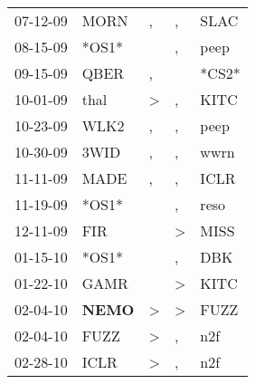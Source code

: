 \begin{supertabular}{p{0.07\textwidth}p{0.06\textwidth}p{0.02\textwidth}p{0.02\textwidth}p{0.06\textwidth}}
          07-12-09\textsuperscript{} &           MORN\textsuperscript{} &                , &                , &           SLAC\textsuperscript{} \\
          08-15-09\textsuperscript{} &                            *OS1* &                  &                , &           peep\textsuperscript{} \\
          09-15-09\textsuperscript{} &           QBER\textsuperscript{} &                , &                  &                            *CS2* \\
          10-01-09\textsuperscript{} &           thal\textsuperscript{} &     \textgreater &                , &           KITC\textsuperscript{} \\
          10-23-09\textsuperscript{} &           WLK2\textsuperscript{} &                , &                , &           peep\textsuperscript{} \\
          10-30-09\textsuperscript{} &           3WID\textsuperscript{} &                , &                , &           wwrn\textsuperscript{} \\
          11-11-09\textsuperscript{} &           MADE\textsuperscript{} &                , &                , &           ICLR\textsuperscript{} \\
          11-19-09\textsuperscript{} &                            *OS1* &                  &                , &           reso\textsuperscript{} \\
          12-11-09\textsuperscript{} &            FIR\textsuperscript{} &                  &     \textgreater &           MISS\textsuperscript{} \\
          01-15-10\textsuperscript{} &                            *OS1* &                  &                , &            DBK\textsuperscript{} \\
          01-22-10\textsuperscript{} &           GAMR\textsuperscript{} &                  &     \textgreater &           KITC\textsuperscript{} \\
          02-04-10\textsuperscript{} &  \textbf{NEMO\textsuperscript{}} &     \textgreater &     \textgreater &           FUZZ\textsuperscript{} \\
          02-04-10\textsuperscript{} &           FUZZ\textsuperscript{} &     \textgreater &                , &            n2f\textsuperscript{} \\
          02-28-10\textsuperscript{} &           ICLR\textsuperscript{} &     \textgreater &                , &            n2f\textsuperscript{} \\

\end{supertabular}
